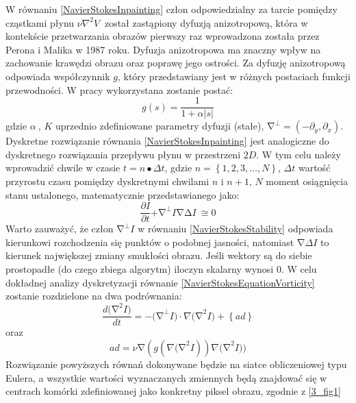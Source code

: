\documentclass[12pt, twoside, openany]{report}
\theoremstyle{definition}
\begin{document}
W równaniu \eqref{NavierStokesInpainting} człon odpowiedzialny za tarcie pomiędzy cząstkami płynu $\nu {\nabla }^2V\ $ został zastąpiony dyfuzją anizotropową, która w kontekście przetwarzania obrazów pierwszy raz wprowadzona została przez Perona i Malika w 1987 roku. Dyfuzja anizotropowa ma znaczny wpływ na zachowanie krawędzi obrazu oraz poprawę jego ostrości. Za dyfuzję anizotropową odpowiada współczynnik $g$, który przedstawiany jest w różnych postaciach funkcji przewodności. W pracy wykorzystana zostanie postać:
\begin{equation}
g\left(s\right)=\frac{1}{1+\alpha \left|s\right|}
\end{equation}
gdzie $\alpha\ $, $K$ uprzednio zdefiniowane parametry dyfuzji (stałe), ${\mathrm{\nabla }}^{\bot }=({-\partial }_y,{\partial }_x)$. 
Dyskretne rozwiązanie równania \eqref{NavierStokesInpainting} jest analogiczne do dyskretnego rozwiązania przepływu płynu w przestrzeni $2D$. W tym celu należy wprowadzić chwile w czasie $t=n\bullet \Delta t$, gdzie $n=\left\{1,2,3,\dots ,N\right\}$, $\Delta t$ wartość przyrostu czasu pomiędzy dyskretnymi chwilami $n$ i $n+1$, $N$ moment osiągnięcia stanu ustalonego, matematycznie przedstawianego jako:
\begin{equation}
\frac{\partial I}{\partial t}\mathrm{+}{\mathrm{\nabla }}^{\mathrm{\bot }}I\mathrm{\nabla }\mathrm{\Delta }I\mathrm{\ }\mathrm{\cong }\mathrm{0}
\label{NavierStokesStability}
\end{equation}
Warto zauważyć, że człon ${\mathrm{\nabla }}^{\bot }I$ w równaniu \eqref{NavierStokesStability} odpowiada kierunkowi rozchodzenia się punktów o podobnej jasności, natomiast $\mathrm{\nabla }\Delta I$ to kierunek największej zmiany smukłości obrazu. Jeśli wektory są do siebie prostopadłe (do czego zbiega algorytm) iloczyn skalarny wynosi 0. 
W celu dokładnej analizy dyskretyzacji równanie \eqref{NavierStokesEquationVorticity} zostanie rozdzielone na dwa podrównania:
\begin{equation}
\frac{d{\mathrm{(}\mathrm{\nabla }}^2I)}{dt}=-{\mathrm{(}\mathrm{\nabla }}^{\bot }I)\cdot \nabla {\mathrm{(}\mathrm{\nabla }}^2I)+\left\{ad\right\}
\label{NavierDiffAdv}
\end{equation}
oraz
\begin{equation}
ad=\nu \mathrm{\nabla }(g(\nabla {\mathrm{(}\mathrm{\nabla }}^2I))\nabla {\mathrm{(}\mathrm{\nabla }}^2I))
\label{NavierAdv}
\end{equation}
Rozwiązanie powyższych równań dokonywane będzie na siatce obliczeniowej typu Eulera, a wszystkie wartości wyznaczanych zmiennych będą znajdować się w centrach komórki zdefiniowanej jako konkretny piksel obrazu, zgodnie z \autoref{3_fig1} 
\end{document}

